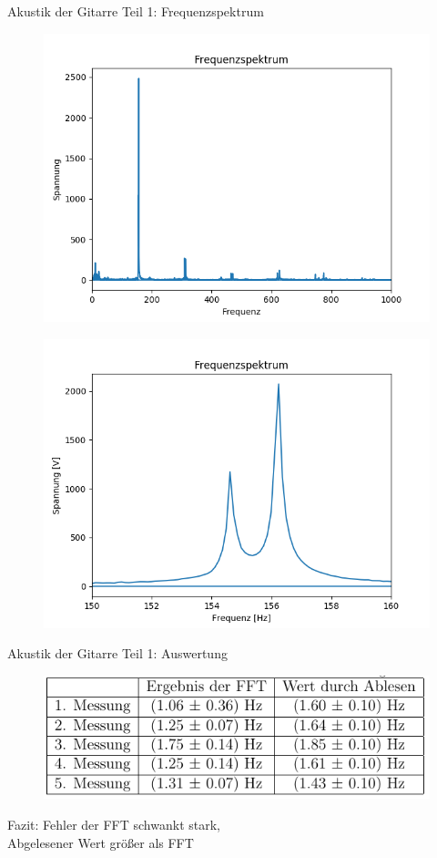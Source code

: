 \documentclass[12pt]{beamer}
\begin{document}
\begin{frame}{Akustik der Gitarre Teil 1: Frequenzspektrum}
	\begin{figure}
		\includegraphics[scale=0.3]{Bilder/Frequenzspektrum_ges.png}
	\end{figure}
	\begin{figure}
		\includegraphics[scale=0.3]{Bilder/Frequenzspektrum_zoom.png}
	\end{figure}
\end{frame}

\begin{frame}{Akustik der Gitarre Teil 1: Auswertung}
	\begin{figure}
		\includegraphics[scale=0.8]{Bilder/SchwebungErgebnisTabelle.PNG}
	\end{figure}
	Fazit: Fehler der FFT schwankt stark, \\ 
	Abgelesener Wert größer als  FFT
\end{frame}
\end{document}
